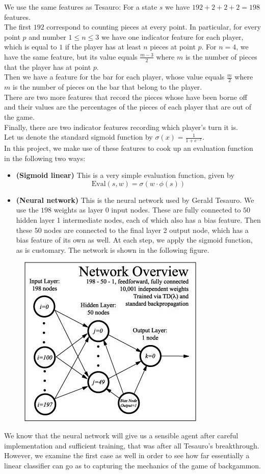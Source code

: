 \documentclass[11pt, a4paper, twoside]{amsart} %
\theoremstyle{definition}
\begin{document}
We use the same features as Tesauro: For a state $s$ we have $192 + 2 + 2 + 2 = 198$ features.\\
The first $192$ correspond to counting pieces at every point. In particular, for every point $p$ and number $1 \leq n \leq 3$ we have one indicator feature for each player, which is equal to $1$ if the player has at least $n$ pieces at point $p$. For $n = 4$, we have the same feature, but its value equals $\frac{m-3}{2}$ where $m$ is the number of pieces that the player has at point $p$.\\
Then we have a feature for the bar for each player, whose value equals $\frac{m}{2}$ where $m$ is the number of pieces on the bar that belong to the player.\\
There are two more features that record the pieces whose have been borne off and their values are the percentages of the pieces of each player that are out of the game.\\
Finally, there are two indicator features recording which player's turn it is.\\
Let us denote the standard sigmoid function by $\sigma(x) = \frac{1}{1 + e^{-x}}$.\\ In this project, we make use of these features to cook up an evaluation function in the following two ways:
\begin{itemize}
\item \textbf{(Sigmoid linear)} This is a very simple evaluation function, given by $$\text{Eval}(s, w) = \sigma \left( w \cdot \phi(s) \right)$$
\item \textbf{(Neural network)} This is the neural network used by Gerald Tesauro. We use the $198$ weights as layer 0 input nodes. These are fully connected to $50$ hidden layer 1 intermediate nodes, each of which also has a bias feature. Then these $50$ nodes are connected to the final layer 2 output node, which has a bias feature of its own as well. At each step, we apply the sigmoid function, as is customary. The network is shown in the following figure.
\end{itemize}
\begin{figure}[H]
  \includegraphics[width=0.4\linewidth]{NeuralNet.jpg}
  \label{fig:boat1}
\end{figure}
We know that the neural network will give us a sensible agent after careful implementation and sufficient training, that was after all Tesauro's breakthrough. However, we examine the first case as well in order to see how far essentially a linear classifier can go as to capturing the mechanics of the game of backgammon.
\end{document}
